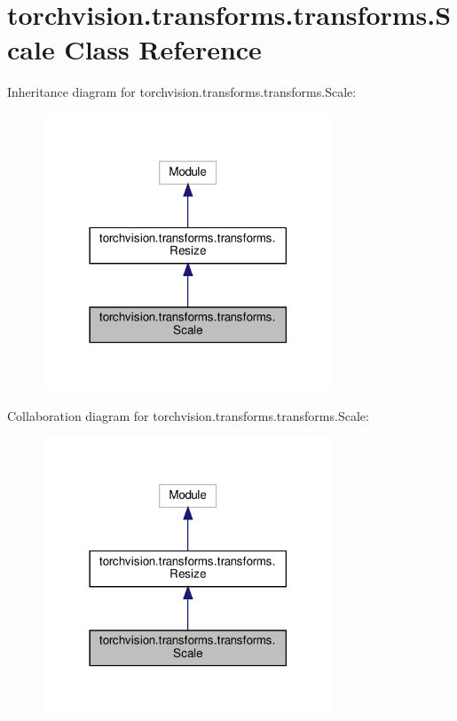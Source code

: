 \hypertarget{classtorchvision_1_1transforms_1_1transforms_1_1Scale}{}\section{torchvision.\+transforms.\+transforms.\+Scale Class Reference}
\label{classtorchvision_1_1transforms_1_1transforms_1_1Scale}


Inheritance diagram for torchvision.\+transforms.\+transforms.\+Scale\+:
\nopagebreak
\begin{figure}[H]
\begin{center}
\leavevmode
\includegraphics[width=246pt]{classtorchvision_1_1transforms_1_1transforms_1_1Scale__inherit__graph}
\end{center}
\end{figure}


Collaboration diagram for torchvision.\+transforms.\+transforms.\+Scale\+:
\nopagebreak
\begin{figure}[H]
\begin{center}
\leavevmode
\includegraphics[width=246pt]{classtorchvision_1_1transforms_1_1transforms_1_1Scale__coll__graph}
\end{center}
\end{figure}

